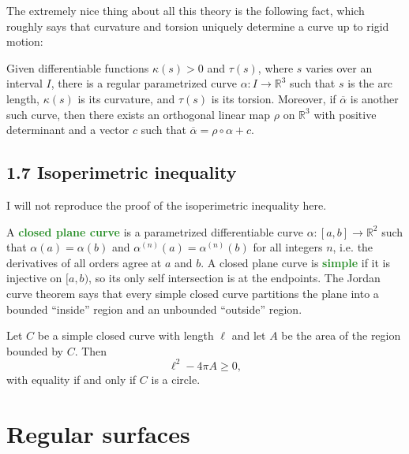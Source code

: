 \documentclass[10pt]{scrartcl}
\providecommand{\ol}{\overline}
\providecommand{\RR}{\mathbb R}
\providecommand{\vocab}[1]{{\textbf{\textcolor{ForestGreen}{#1}}}}
\begin{document}
The extremely nice thing about all this theory is the following fact,
which roughly says that curvature and torsion uniquely
determine a curve up to rigid motion:
\begin{theorem}
	Given differentiable functions $\kappa(s)>0$ and $\tau(s)$,
	where $s$ varies over an interval $I$, there is a
	regular parametrized curve $\alpha\colon I\to\RR^3$ such that
	$s$ is the arc length, $\kappa(s)$ is its curvature,
	and $\tau(s)$ is its torsion.
	Moreover, if $\ol\alpha$ is another such curve, then
	there exists an orthogonal linear map $\rho$ on $\RR^3$
	with positive determinant and a vector $c$
	such that $\ol\alpha=\rho\circ \alpha + c$.
\end{theorem}

\subsection{1.7 Isoperimetric inequality}
I will not reproduce the proof of the isoperimetric inequality here.

A \vocab{closed plane curve} is a parametrized differentiable curve
$\alpha\colon[a,b]\to\RR^2$ such that $\alpha(a)=\alpha(b)$
and $\alpha^{(n)}(a) = \alpha^{(n)}(b)$ for all integers $n$,
i.e. the derivatives of all orders agree at $a$ and $b$.
A closed plane curve is \vocab{simple} if it is injective on $[a,b)$,
so its only self intersection is at the endpoints.
The Jordan curve theorem says that every simple closed curve
partitions the plane into a bounded ``inside'' region
and an unbounded ``outside'' region.
\begin{theorem}
	Let $C$ be a simple closed curve with length $\ell$
	and let $A$ be the area of the region bounded by $C$. Then
	\[\ell^2-4\pi A\ge 0,\]
	with equality if and only if $C$ is a circle.
\end{theorem}

\section{Regular surfaces}
\end{document}
